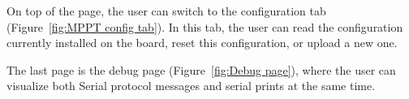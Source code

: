         On top of the page, the user can switch to the configuration tab (Figure~\ref{fig:MPPT config tab}). In this tab, the user can read the configuration currently installed on the board, reset this configuration, or upload a new one.

        The last page is the debug page (Figure~\ref{fig:Debug page}), where the user can visualize both Serial protocol messages and serial prints at the same time.



    



